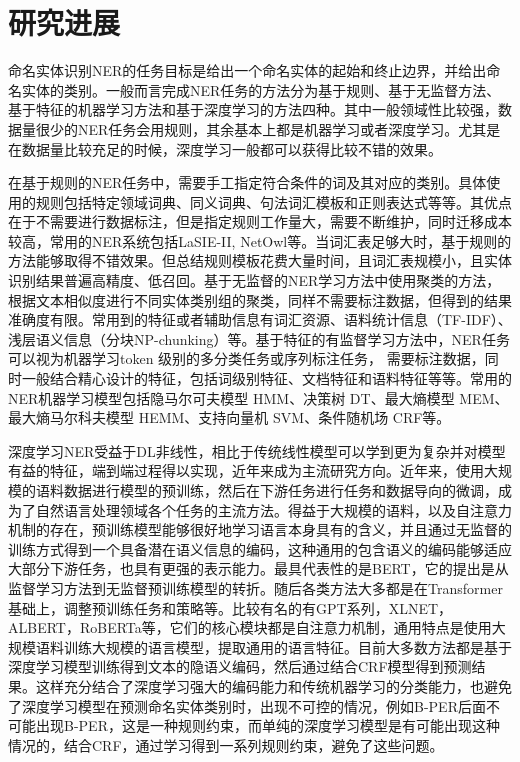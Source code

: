 \documentclass[a4paper, 12pt]{article}
\begin{document}
\section{研究进展} %
\label{sec:progress}
命名实体识别NER的任务目标是给出一个命名实体的起始和终止边界，并给出命名实体的类别。一般而言完成NER任务的方法分为基于规则、基于无监督方法、基于特征的机器学习方法和基于深度学习的方法四种。其中一般领域性比较强，数据量很少的NER任务会用规则，其余基本上都是机器学习或者深度学习。尤其是在数据量比较充足的时候，深度学习一般都可以获得比较不错的效果。

在基于规则的NER任务中，需要手工指定符合条件的词及其对应的类别。具体使用的规则包括特定领域词典、同义词典、句法词汇模板和正则表达式等等。其优点在于不需要进行数据标注，但是指定规则工作量大，需要不断维护，同时迁移成本较高，常用的NER系统包括LaSIE-II, NetOwl等。当词汇表足够大时，基于规则的方法能够取得不错效果。但总结规则模板花费大量时间，且词汇表规模小，且实体识别结果普遍高精度、低召回。基于无监督的NER学习方法中使用聚类的方法，根据文本相似度进行不同实体类别组的聚类，同样不需要标注数据，但得到的结果准确度有限。常用到的特征或者辅助信息有词汇资源、语料统计信息（TF-IDF）、浅层语义信息（分块NP-chunking）等。基于特征的有监督学习方法中，NER任务可以视为机器学习token 级别的多分类任务或序列标注任务， 需要标注数据，同时一般结合精心设计的特征，包括词级别特征、文档特征和语料特征等等。常用的NER机器学习模型包括隐马尔可夫模型 HMM、决策树 DT、最大熵模型 MEM、最大熵马尔科夫模型 HEMM、支持向量机 SVM、条件随机场 CRF等。

深度学习NER受益于DL非线性，相比于传统线性模型可以学到更为复杂并对模型有益的特征，端到端过程得以实现，近年来成为主流研究方向。近年来，使用大规模的语料数据进行模型的预训练，然后在下游任务进行任务和数据导向的微调，成为了自然语言处理领域各个任务的主流方法。得益于大规模的语料，以及自注意力机制的存在，预训练模型能够很好地学习语言本身具有的含义，并且通过无监督的训练方式得到一个具备潜在语义信息的编码，这种通用的包含语义的编码能够适应大部分下游任务，也具有更强的表示能力。最具代表性的是BERT，它的提出是从监督学习方法到无监督预训练模型的转折。随后各类方法大多都是在Transformer基础上，调整预训练任务和策略等。比较有名的有GPT系列，XLNET，ALBERT，RoBERTa等，它们的核心模块都是自注意力机制，通用特点是使用大规模语料训练大规模的语言模型，提取通用的语言特征。目前大多数方法都是基于深度学习模型训练得到文本的隐语义编码，然后通过结合CRF模型得到预测结果。这样充分结合了深度学习强大的编码能力和传统机器学习的分类能力，也避免了深度学习模型在预测命名实体类别时，出现不可控的情况，例如B-PER后面不可能出现B-PER，这是一种规则约束，而单纯的深度学习模型是有可能出现这种情况的，结合CRF，通过学习得到一系列规则约束，避免了这些问题。
\end{document}
